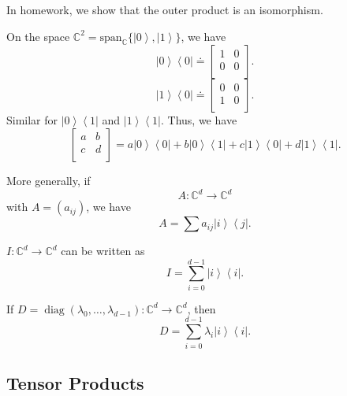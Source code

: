 In homework, we show that the outer product is an isomorphism.

\begin{example}
		On the space $\mathbb{C}^2 = \text{span}_{\mathbb{C}} \{\left| 0 \right\rangle , \left| 1 \right\rangle \} $, we have
			\[
				\left| 0 \right\rangle \left\langle 0 \right| \doteq 
					\begin{bmatrix}
						1 & 0 \\
						0 & 0 \\
					\end{bmatrix}
			.\] 
			\[
				\left| 1 \right\rangle \left\langle 0 \right| \doteq
					\begin{bmatrix}
						0 & 0 \\
						1 & 0 \\
					\end{bmatrix}
			.\] 
			Similar for $\left| 0 \right\rangle \left\langle 1 \right| $ and $\left| 1 \right\rangle \left\langle 1 \right| $.
			Thus, we have
			\[
				\begin{bmatrix}
					a & b \\
					c & d \\
				\end{bmatrix}
				= a \left| 0 \right\rangle \left\langle 0 \right| + b \left| 0 \right\rangle \left\langle 1 \right|  + c \left| 1 \right\rangle  \left\langle 0 \right|  + d \left| 1 \right\rangle \left\langle 1 \right| 
			.\] 
\end{example}

More generally, if
				\[
					A: \mathbb{C}^d \to \mathbb{C}^d
				\] 
				with $A = \left( a_{i j} \right) $, we have
				\[
					A = \sum a_{i j} \left| i \right\rangle  \left\langle j \right| 
				.\] 

\begin{example}
	$I: \mathbb{C}^d \to \mathbb{C}^d$ can be written as
	\[
		I = \sum_{i = 0}^{ d - 1} \left| i \right\rangle  \left\langle i \right| 
	.\] 
\end{example}

\begin{example}
	If $D = \operatorname{diag} \left( \lambda_0, \ldots, \lambda_{d - 1} \right) : \mathbb{C}^d \to \mathbb{C}^d$, then
	\[
		D = \sum_{i = 0}^{d - 1} \lambda_i \left| i \right\rangle  \left\langle i \right| 
	.\] 
\end{example}


\subsection{Tensor Products}

